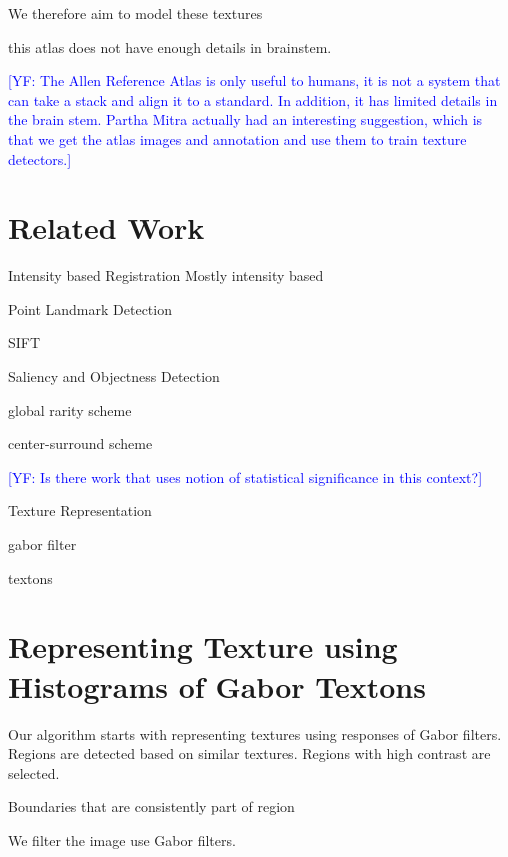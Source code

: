 \documentclass{llncs}
\newcommand{\authcmt}[2]{\textcolor{#1}{#2}}
\newcommand{\yoav}[1]{\authcmt{blue}{[YF: #1]}}
\begin{document}
 We therefore aim to model these textures

this atlas does not have enough details in brainstem. 




\yoav{The Allen Reference Atlas is only useful to humans, it is not a
  system that can take a stack and align it to a standard. In
  addition, it has limited details in the brain stem. Partha Mitra
  actually had an interesting suggestion, which is that we get the
  atlas images and annotation and use them to train texture
  detectors.}

\section{Related Work}

\begin{description}

\item{Intensity based Registration}
Mostly intensity based


\item{Point Landmark Detection}

SIFT

\item{Saliency and Objectness Detection}

global rarity scheme

center-surround scheme

\yoav{Is there work that uses notion of statistical significance in
  this context?}

\item{Texture Representation}

gabor filter

textons


\end{description}

\section{Representing Texture using Histograms of Gabor Textons}

Our algorithm starts with representing textures using responses of Gabor filters. Regions are detected based on similar textures. Regions with high contrast are selected. 

  Boundaries that are consistently part of region

We filter the image use Gabor filters.
\end{document}
